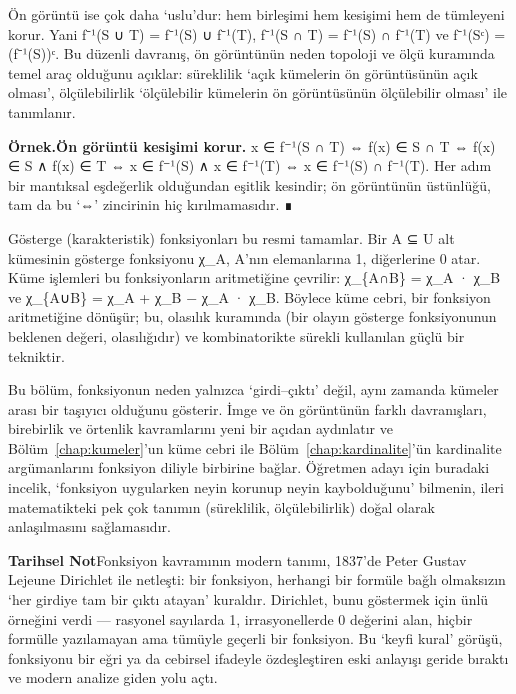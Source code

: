 Ön görüntü ise çok daha ‘uslu’dur: hem birleşimi hem kesişimi hem de tümleyeni korur. Yani f⁻¹(S ∪ T) = f⁻¹(S) ∪ f⁻¹(T), f⁻¹(S ∩ T) = f⁻¹(S) ∩ f⁻¹(T) ve f⁻¹(Sᶜ) = (f⁻¹(S))ᶜ. Bu düzenli davranış, ön görüntünün neden topoloji ve ölçü kuramında temel araç olduğunu açıklar: süreklilik ‘açık kümelerin ön görüntüsünün açık olması’, ölçülebilirlik ‘ölçülebilir kümelerin ön görüntüsünün ölçülebilir olması’ ile tanımlanır.

\begin{tcolorbox}[bookbox,colback=cEx]\textbf{\textsf{\textcolor{cAcc}{Örnek.}}}\quad \textbf{Ön görüntü kesişimi korur. }x ∈ f⁻¹(S ∩ T) ⇔ f(x) ∈ S ∩ T ⇔ f(x) ∈ S ∧ f(x) ∈ T ⇔ x ∈ f⁻¹(S) ∧ x ∈ f⁻¹(T) ⇔ x ∈ f⁻¹(S) ∩ f⁻¹(T). Her adım bir mantıksal eşdeğerlik olduğundan eşitlik kesindir; ön görüntünün üstünlüğü, tam da bu ‘⇔’ zincirinin hiç kırılmamasıdır. ∎\end{tcolorbox}

Gösterge (karakteristik) fonksiyonları bu resmi tamamlar. Bir A ⊆ U alt kümesinin gösterge fonksiyonu χ\_A, A’nın elemanlarına 1, diğerlerine 0 atar. Küme işlemleri bu fonksiyonların aritmetiğine çevrilir: χ\_\{A∩B\} = χ\_A · χ\_B ve χ\_\{A∪B\} = χ\_A + χ\_B − χ\_A · χ\_B. Böylece küme cebri, bir fonksiyon aritmetiğine dönüşür; bu, olasılık kuramında (bir olayın gösterge fonksiyonunun beklenen değeri, olasılığıdır) ve kombinatorikte sürekli kullanılan güçlü bir tekniktir.

Bu bölüm, fonksiyonun neden yalnızca ‘girdi–çıktı’ değil, aynı zamanda kümeler arası bir taşıyıcı olduğunu gösterir. İmge ve ön görüntünün farklı davranışları, birebirlik ve örtenlik kavramlarını yeni bir açıdan aydınlatır ve Bölüm~\ref{chap:kumeler}’un küme cebri ile Bölüm~\ref{chap:kardinalite}’ün kardinalite argümanlarını fonksiyon diliyle birbirine bağlar. Öğretmen adayı için buradaki incelik, ‘fonksiyon uygularken neyin korunup neyin kaybolduğunu’ bilmenin, ileri matematikteki pek çok tanımın (süreklilik, ölçülebilirlik) doğal olarak anlaşılmasını sağlamasıdır.

\begin{tcolorbox}[bookbox,colback=cDef]\textbf{\textsf{\textcolor{cAcc}{Tarihsel Not}}}\quad Fonksiyon kavramının modern tanımı, 1837’de Peter Gustav Lejeune Dirichlet ile netleşti: bir fonksiyon, herhangi bir formüle bağlı olmaksızın ‘her girdiye tam bir çıktı atayan’ kuraldır. Dirichlet, bunu göstermek için ünlü örneğini verdi — rasyonel sayılarda 1, irrasyonellerde 0 değerini alan, hiçbir formülle yazılamayan ama tümüyle geçerli bir fonksiyon. Bu ‘keyfi kural’ görüşü, fonksiyonu bir eğri ya da cebirsel ifadeyle özdeşleştiren eski anlayışı geride bıraktı ve modern analize giden yolu açtı.\end{tcolorbox}

